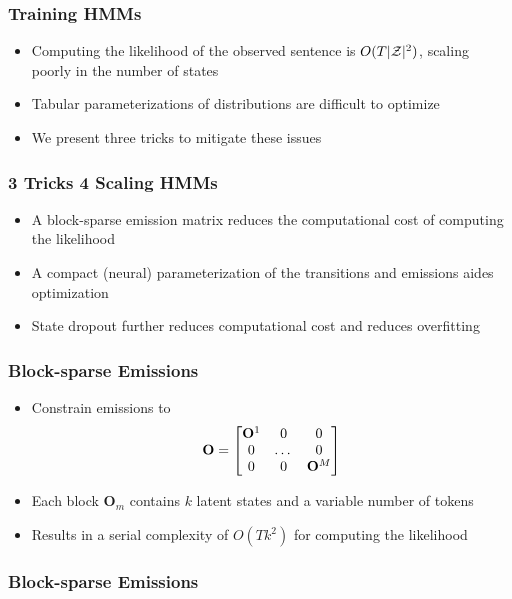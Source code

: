 \documentclass{beamer}
\begin{document}
\begin{frame}
\frametitle{Training HMMs}
\begin{itemize}
\item Computing the likelihood of the observed sentence is $O(T|\mathcal{Z}|^2)$,
    scaling poorly in the number of states
\item Tabular parameterizations of distributions are difficult to optimize
\item We present three tricks to mitigate these issues
\end{itemize}
\end{frame}

\begin{frame}
\frametitle{3 Tricks 4 Scaling HMMs}
\begin{itemize}
\item A block-sparse emission matrix reduces the computational cost of computing the likelihood
\item A compact (neural) parameterization of the transitions and emissions
    aides optimization
\item State dropout further reduces computational cost and reduces overfitting
\end{itemize}
\end{frame}

\begin{frame}
\frametitle{Block-sparse Emissions}
\begin{itemize}
\item Constrain emissions to
\[\mathbf{O} = \begin{bmatrix} \mathbf{O}^1 & 0 & 0 \\ 0 & $\dots$ & 0 \\ 0 & 0 & \mathbf{O}^M \\
\end{bmatrix}\]
\item Each block $\mathbf{O}_m$ contains $k$ latent states and a variable number of tokens
\item Results in a serial complexity of $O(Tk^2)$ for computing the likelihood
\end{itemize}
\end{frame}

\begin{frame}
\frametitle{Block-sparse Emissions}
\centering

\end{frame}
\end{document}
